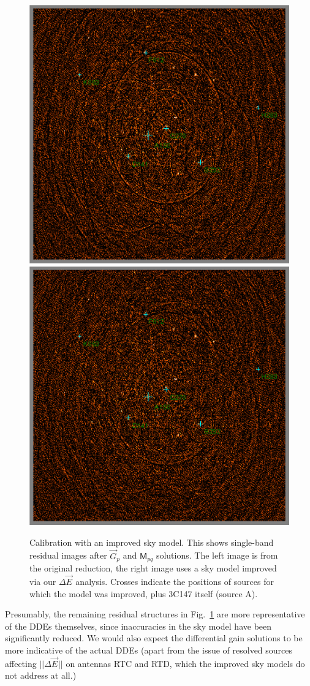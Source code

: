 \documentclass[]{aa}
\newcommand{\jones}[2]{\vec {#1}_{#2}}
\newcommand{\coh}[2]{\mathsf{{#1}}_{{#2}}}
\begin{document}
\begin{figure}
\begin{centering}
\includegraphics[width=.5\columnwidth]{spw2_oldmodel}%
\includegraphics[width=.5\columnwidth]{spw2_newmodel}\par
\end{centering}
\caption{\label{fig:residuals-newmodel}Calibration with an improved sky model. This shows single-band residual images after $\jones{G}{p}$ and $\coh{M}{pq}$ solutions. The left image is from the original reduction, the right image uses a sky model improved via our $\Delta\jones{E}{}$ analysis. Crosses indicate the positions of sources for which the model was improved, plus 3C147 itself (source A).}
\end{figure}

Presumably, the remaining residual structures in Fig.~\ref{fig:residuals-newmodel} are more representative of the DDEs themselves, since inaccuracies in the sky model have been significantly reduced. We would also expect the differential gain solutions to be more indicative of the actual DDEs (apart from the issue of resolved sources affecting $||\Delta\jones{E}{}||$ on antennas RTC and RTD, which the improved sky models do not address at all.)
\end{document}
